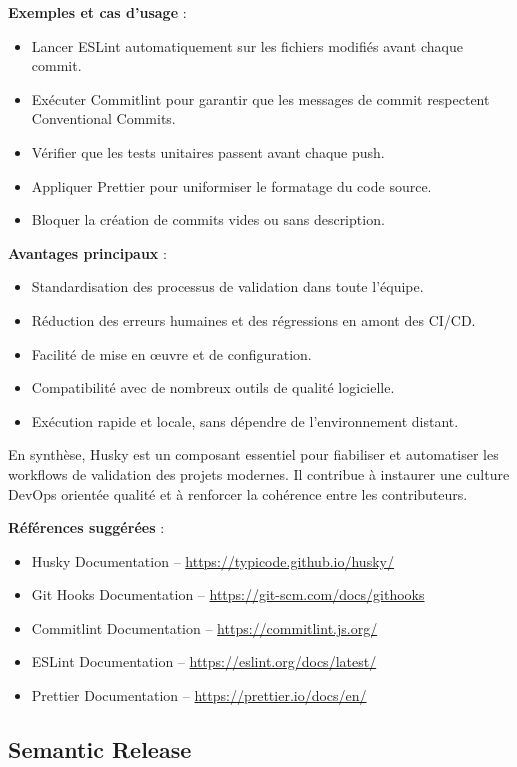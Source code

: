 \textbf{Exemples et cas d’usage} :
\begin{itemize}
	\item Lancer ESLint automatiquement sur les fichiers modifiés avant chaque commit.
	\item Exécuter Commitlint pour garantir que les messages de commit respectent Conventional Commits.
	\item Vérifier que les tests unitaires passent avant chaque push.
	\item Appliquer Prettier pour uniformiser le formatage du code source.
	\item Bloquer la création de commits vides ou sans description.
\end{itemize}

\textbf{Avantages principaux} :
\begin{itemize}
	\item Standardisation des processus de validation dans toute l’équipe.
	\item Réduction des erreurs humaines et des régressions en amont des CI/CD.
	\item Facilité de mise en œuvre et de configuration.
	\item Compatibilité avec de nombreux outils de qualité logicielle.
	\item Exécution rapide et locale, sans dépendre de l’environnement distant.
\end{itemize}

En synthèse, Husky est un composant essentiel pour fiabiliser et automatiser les workflows de validation des projets modernes. Il contribue à instaurer une culture DevOps orientée qualité et à renforcer la cohérence entre les contributeurs.

\textbf{Références suggérées} :
\begin{itemize}
	\item Husky Documentation – \url{https://typicode.github.io/husky/}
	\item Git Hooks Documentation – \url{https://git-scm.com/docs/githooks}
	\item Commitlint Documentation – \url{https://commitlint.js.org/}
	\item ESLint Documentation – \url{https://eslint.org/docs/latest/}
	\item Prettier Documentation – \url{https://prettier.io/docs/en/}
\end{itemize}

\subsection{Semantic Release}

